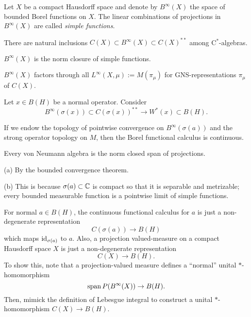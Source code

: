 \documentclass{../../large}
\begin{document}
\begin{prb}
Let $X$ be a compact Hausdorff space and denote by $B^\infty(X)$ the space of bounded Borel functions on $X$.
The linear combinations of projections in $B^\infty(X)$ are called \emph{simple functions}.
\begin{parts}
\item There are natural inclusions $C(X)\subset B^\infty(X)\subset C(X)^{**}$ among C$^*$-algebras.
\item $B^\infty(X)$ is the norm closure of simple functions.
\item $B^\infty(X)$ factors through all $L^\infty(X,\mu):=M(\pi_\mu)$ for GNS-representations $\pi_\mu$ of $C(X)$.
\end{parts}
\end{prb}

\begin{prb}
Let $x\in B(H)$ be a normal operator.
Consider
\[B^\infty(\sigma(x))\subset C(\sigma(x))^{**}\to W^*(x)\subset B(H).\]
\begin{parts}
\item If we endow the topology of pointwise convergence on $B^\infty(\sigma(a))$ and the strong operator topology on $M$, then the Borel functional calculus is continuous.
\item Every von Neumann algebra is the norm closed span of projections.
\end{parts}
\end{prb}
\begin{pf}
(a)
By the bounded convergence theorem.

(b)
This is because $\sigma(a)\subset\mathbb{C}$ is compact so that it is separable and metrizable; every bounded measurable function is a pointwise limit of simple functions.

\end{pf}



For normal $a\in B(H)$, the continuous functional calculus for $a$ is just a non-degenerate representation
\[C(\sigma(a))\to B(H)\]
which maps $\operatorname{id}_{\sigma(a)}$ to $a$.
Also, a projection valued-measure on a compact Hausdorff space $X$ is just a non-degenerate representation
\[C(X)\to B(H).\]
To show this, note that a projection-valued measure defines a ``normal'' unital $*$-homomorphism
\[\operatorname{span} P(B^\infty(X))\to B(H).\]
Then, mimick the definition of Lebesgue integral to construct a unital $*$-homomorphism $C(X)\to B(H)$.
\end{document}
